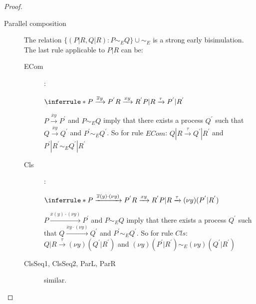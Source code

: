 \begin{lemma}
\begin{proof}
\begin{description}
\begin{description}
	\end{description}
      \item[Parallel composition]
	The relation $\{(P|R, Q|R): P\sim_{E} Q\} \cup \sim_{E}$ is a strong early bisimulation. The last rule applicable to $P|R$ can be:
	\begin{description}
	  \item[ECom]:
	    \begin{center}
	      $\inferrule* {
		  P \xrightarrow{\overline{x}y} P^{'}
		\\
		  R \xrightarrow{xy} R^{'}
	      }{
		P|R \xrightarrow{\tau} P^{'}|R^{'}
	      }$
	    \end{center}
	    $P \xrightarrow{\overline{x}y} P^{'}$ and $P\sim_{E} Q$ imply that there exists a process $Q^{'}$ such that $Q \xrightarrow{\overline{x}y} Q^{'}$ and $P^{'}\sim_{E} Q^{'}$. So for rule $ECom$: $Q|R \xrightarrow{\tau} Q^{'}|R^{'}$ and $P^{'}|R^{'}\sim_{E} Q^{'}|R^{'}$
	  \item[Cls]:
	    \begin{center}
	      $\inferrule* {
		  P \xrightarrow{\overline{x}(y) \cdot (\nu y)} P^{'}
		\\
		  R \xrightarrow{xy} R^{'}
	      }{
		P|R \xrightarrow{\tau} (\nu y)(P^{'}|R^{'})
	      }$
	    \end{center}
	    $P \xrightarrow{\overline{x}(y) \cdot (\nu y)} P^{'}$ and $P\sim_{E} Q$ imply that there exists a process $Q^{'}$ such that $Q \xrightarrow{\overline{x}y \cdot (\nu y)} Q^{'}$ and $P^{'}\sim_{E} Q^{'}$. So for rule $Cls$: $Q|R \xrightarrow{\tau} (\nu y)(Q^{'}|R^{'})$ and $(\nu y)(P^{'}|R^{'}) \sim_{E} (\nu y)(Q^{'}|R^{'})$
	  \item[ClsSeq1, ClsSeq2, ParL, ParR] similar.
	\end{description}
    \end{description}
  \end{proof}
\end{lemma}


